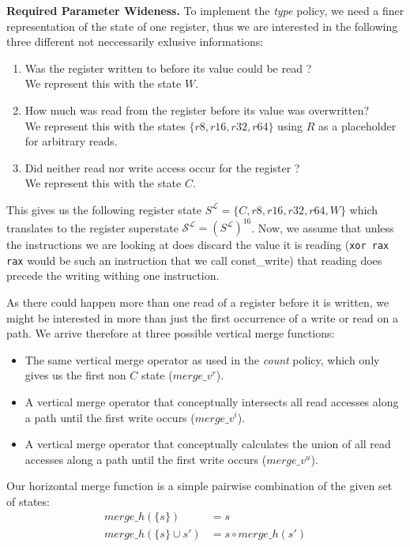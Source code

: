 \textbf{Required Parameter Wideness.}
\label{subsection:requiredparamwideness}
To implement the \emph{type} policy, we need a finer representation of the state of one register, thus we are interested in the following
three different not neccessarily exlusive informations:
\begin{enumerate}
\item Was the register written to before its value could be read ? \\ We represent this with the state $W$.
\item How much was read from the register before its value was overwritten? \\ We represent this with the states $\{ r8, r16, r32, r64 \}$ 
using $R$ as a placeholder for arbitrary reads.
\item Did neither read nor write access occur for the register ? \\ We represent this with the state $C$.
\end{enumerate}
This gives us the following register state $S^\mathcal{L} = \{ C, r8, r16, r32, r64, W \}$ which translates to the register superstate 
$\mathcal{S}^\mathcal{L} = (S^\mathcal{L})^{16}$.
Now, we assume that unless the instructions we are looking at does discard the value it is reading (\texttt{xor rax rax} would be such 
an instruction that we call const\_write) that reading does precede the writing withing one instruction.

As there could happen more than one read of a register before it is written, we might be interested in more than just the first occurrence
of a write or read on a path. We arrive therefore at three possible vertical merge functions:
\begin{itemize}
	\item The same vertical merge operator as used in the \emph{count} policy, which only gives us the first non $C$ state ($merge\_v^{r}$).
	\item A vertical merge operator that conceptually intersects all read accesses along a path until the first write occurs ($merge\_v^{i}$).
	\item A vertical merge operator that conceptually calculates the union of all read accesses along a path until the first write occurs ($merge\_v^{u}$).
\end{itemize}

Our horizontal merge function is a simple pairwise combination of the given set of states:
\begin{align}
merge\_h(\{s\}) &= s\\
merge\_h(\{s\} \cup s') &= s \circ merge\_h(s')
\end{align}

